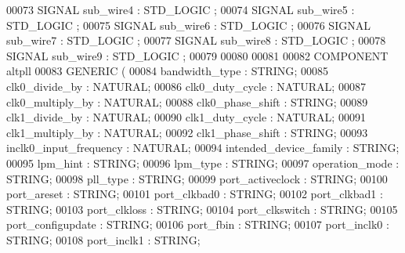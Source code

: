 \begin{DoxyCode}
{00073     \textcolor{keywordflow}{SIGNAL} \textcolor{vhdlchar}{sub_wire4}    \textcolor{vhdlchar}{:} \textcolor{comment}{STD\_LOGIC} ;
00074     \textcolor{keywordflow}{SIGNAL} \textcolor{vhdlchar}{sub_wire5}    \textcolor{vhdlchar}{:} \textcolor{comment}{STD\_LOGIC} ;
00075     \textcolor{keywordflow}{SIGNAL} \textcolor{vhdlchar}{sub_wire6}    \textcolor{vhdlchar}{:} \textcolor{comment}{STD\_LOGIC} ;
00076     \textcolor{keywordflow}{SIGNAL} \textcolor{vhdlchar}{sub_wire7}    \textcolor{vhdlchar}{:} \textcolor{comment}{STD\_LOGIC} ;
00077     \textcolor{keywordflow}{SIGNAL} \textcolor{vhdlchar}{sub_wire8}    \textcolor{vhdlchar}{:} \textcolor{comment}{STD\_LOGIC} ;
00078     \textcolor{keywordflow}{SIGNAL} \textcolor{vhdlchar}{sub_wire9}    \textcolor{vhdlchar}{:} \textcolor{comment}{STD\_LOGIC} ;
00079 
00080 
00081 
00082     \textcolor{keywordflow}{COMPONENT} altpll
00083     \textcolor{keywordflow}{GENERIC} (
00084         bandwidth\_type      : \textcolor{comment}{STRING};
00085         clk0\_divide\_by      : \textcolor{comment}{NATURAL};
00086         clk0\_duty\_cycle     : \textcolor{comment}{NATURAL};
00087         clk0\_multiply\_by        : \textcolor{comment}{NATURAL};
00088         clk0\_phase\_shift        : \textcolor{comment}{STRING};
00089         clk1\_divide\_by      : \textcolor{comment}{NATURAL};
00090         clk1\_duty\_cycle     : \textcolor{comment}{NATURAL};
00091         clk1\_multiply\_by        : \textcolor{comment}{NATURAL};
00092         clk1\_phase\_shift        : \textcolor{comment}{STRING};
00093         inclk0\_input\_frequency      : \textcolor{comment}{NATURAL};
00094         intended\_device\_family      : \textcolor{comment}{STRING};
00095         lpm\_hint        : \textcolor{comment}{STRING};
00096         lpm\_type        : \textcolor{comment}{STRING};
00097         operation\_mode      : \textcolor{comment}{STRING};
00098         pll\_type        : \textcolor{comment}{STRING};
00099         port\_activeclock        : \textcolor{comment}{STRING};
00100         port\_areset     : \textcolor{comment}{STRING};
00101         port\_clkbad0        : \textcolor{comment}{STRING};
00102         port\_clkbad1        : \textcolor{comment}{STRING};
00103         port\_clkloss        : \textcolor{comment}{STRING};
00104         port\_clkswitch      : \textcolor{comment}{STRING};
00105         port\_configupdate       : \textcolor{comment}{STRING};
00106         port\_fbin       : \textcolor{comment}{STRING};
00107         port\_inclk0     : \textcolor{comment}{STRING};
00108         port\_inclk1     : \textcolor{comment}{STRING};
}
\end{DoxyCode}
